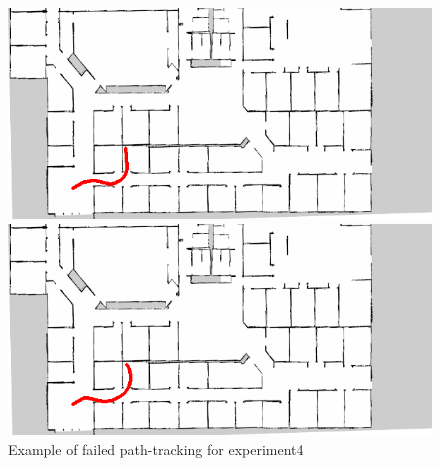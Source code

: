 \begin{figure}[h]
  \begin{minipage}[b]{0.45\linewidth}
    \centering
    \includegraphics[keepaspectratio, scale=0.33]{images/00_02_rename/traject9.png}
    \subcaption{}
  \end{minipage}
  \begin{minipage}[b]{0.45\linewidth}
    \centering
    \includegraphics[keepaspectratio, scale=0.33]{images/00_02_rename/traject28.png}
    \subcaption{}
  \end{minipage}
\caption{Example of failed path-tracking for experiment4}
\label{Fig:fail4}
\end{figure}

